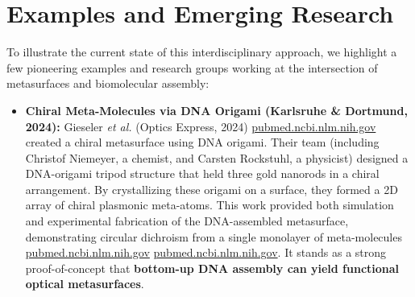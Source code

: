 \documentclass[11pt,a4paper]{article}
\begin{document}
\section{Examples and Emerging Research}

To illustrate the current state of this interdisciplinary approach, we highlight a few pioneering examples and research groups working at the intersection of metasurfaces and biomolecular assembly:

\begin{itemize}
  \item \textbf{Chiral Meta-Molecules via DNA Origami (Karlsruhe \& Dortmund, 2024):} Gieseler \emph{et al.} (Optics Express, 2024) \href{https://pubmed.ncbi.nlm.nih.gov/38859241/#:~:text=response in a much more,simulate the optical properties but}{pubmed.ncbi.nlm.nih.gov} created a chiral metasurface using DNA origami. Their team (including Christof Niemeyer, a chemist, and Carsten Rockstuhl, a physicist) designed a DNA-origami tripod structure that held three gold nanorods in a chiral arrangement. By crystallizing these origami on a surface, they formed a 2D array of chiral plasmonic meta-atoms. This work provided both simulation and experimental fabrication of the DNA-assembled metasurface, demonstrating circular dichroism from a single monolayer of meta-molecules \href{https://pubmed.ncbi.nlm.nih.gov/38859241/#:~:text=Chiral materials are essential to,production%2C to fabricate a chiral}{pubmed.ncbi.nlm.nih.gov} \href{https://pubmed.ncbi.nlm.nih.gov/38859241/#:~:text=tripod and simulate its optical,of the suggested approach critically}{pubmed.ncbi.nlm.nih.gov}. It stands as a strong proof-of-concept that \textbf{bottom-up DNA assembly can yield functional optical metasurfaces}.

\end{itemize}
\end{document}
